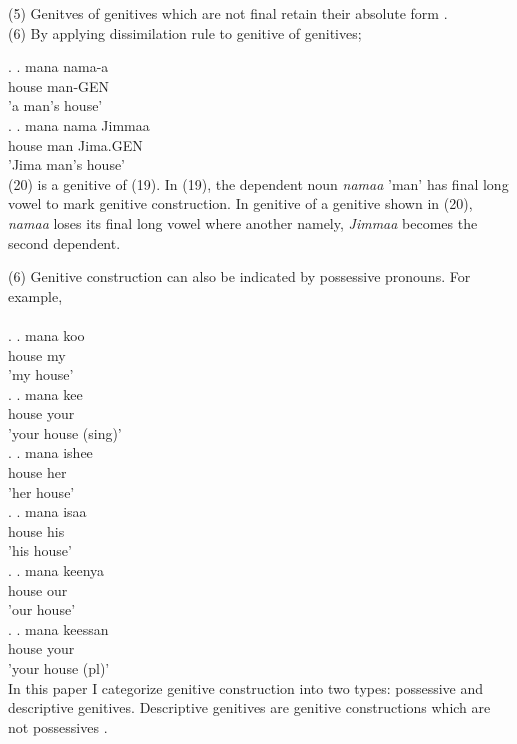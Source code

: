\documentclass[11pt,a4paper]{article}
\begin{document}
	(5) Genitves of genitives which are not final retain their absolute form \cite[104]{owens1985grammar}. \\
	
	(6) By applying dissimilation rule to genitive of genitives;
	
	\ex.
	\ag.
	mana nama-a \\
	house man-GEN\\
	'a man's house'\\
	
	\ex.
	\ag.
	mana nama Jimmaa \\
	house man Jima.GEN\\
	'Jima man's house'\\
	
	(20) is a genitive of (19). In (19), the dependent noun \emph{namaa} 'man' has final long vowel to mark genitive construction. In genitive of a genitive shown in (20), \emph{namaa} loses its final long vowel where another namely, \emph{Jimmaa} becomes the second dependent.
	
	(6) Genitive construction can also be indicated by possessive pronouns. For example,\\
	\\
	\ex.
	\ag.
	mana koo \\
	house my \\
	'my house'\\
	
	\ex.
	\ag.
	mana kee \\
	house your\\
	'your house (sing)'\\
	
	\ex.
	\ag.
	mana ishee \\
	house her\\
	'her house'\\
	
	\ex.
	\ag.
	mana isaa \\
	house his\\
	'his house'\\
	
	\ex.
	\ag.
	mana keenya \\
	house our\\
	'our house'\\
	
	\ex.
	\ag.
	mana keessan \\
	house your\\
	'your house (pl)'\\

	
	In this paper I categorize genitive construction into two types: possessive and descriptive genitives. Descriptive genitives are genitive constructions which are not possessives \cite{rosenbach2006descriptive}.
	
\end{document}

